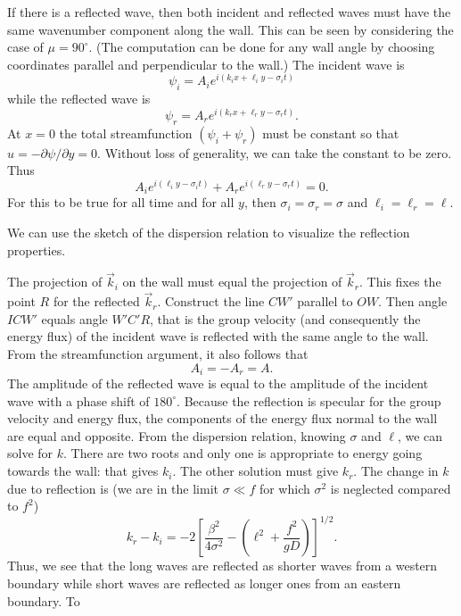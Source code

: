 If there is a reflected wave, then both incident and reflected waves must have the same
wavenumber component along the wall. This can be seen by considering the case of
$\mu=90^\circ$. (The computation can be done for any wall angle by choosing
coordinates parallel and perpendicular to the wall.) The incident wave is
\[
	\psi_i=A_i e^{i(k_i x+\ell_i y-\sigma_i t)}
\]
while the reflected wave is
\[
	\psi_r=A_r e^{i(k_r x+\ell_r y-\sigma_r t)}.
\]
At $x=0$ the total streamfunction $(\psi_i+\psi_r)$ must be constant so that
$u=-\partial\psi/\partial y=0$. Without loss of generality, we can take the constant
to be zero. Thus
\[
	A_i e^{i(\ell_i y-\sigma_i t)}
	+A_r e^{i(\ell_r y-\sigma_r t)}=0.
\]
For this to be true for all time and for all $y$, then
$\sigma_i=\sigma_r=\sigma$ and $\ell_i=\ell_r=\ell$.

We can use the sketch of the dispersion relation to visualize the reflection
properties.

\sourcepagebreak


The projection of $\vec k_i$ on the wall must equal the projection of $\vec k_r$. This
fixes the point $R$ for the reflected $\vec k_r$. Construct the line $CW'$ parallel to
$OW$. Then angle $ICW'$ equals angle $W'C'R$, that is the group velocity (and
consequently the energy flux) of the incident wave is reflected with the same angle to
the wall. From the streamfunction argument, it also follows that
\[
	A_i=-A_r=A.
\]
The amplitude of the reflected wave is equal to the amplitude of the incident wave with
a phase shift of $180^\circ$. Because the reflection is specular for the group velocity
and energy flux, the components of the energy flux normal to the wall are equal and
opposite. From the dispersion relation, knowing $\sigma$ and $\ell$, we can solve for
$k$. There are two roots and only one is appropriate to energy going towards the wall:
that gives $k_i$. The other solution must give $k_r$. The change in $k$ due to
reflection is (we are in the limit $\sigma\ll f$ for which $\sigma^2$ is neglected
compared to $f^2$)
\[
	k_r-k_i=-2\left[
		\frac{\beta^2}{4\sigma^2}
		-\left(\ell^2+\frac{f^2}{gD}\right)
		\right]^{1/2}.
\]
Thus, we see that the long waves are reflected as shorter waves from a western boundary
while short waves are reflected as longer ones from an eastern boundary. To

